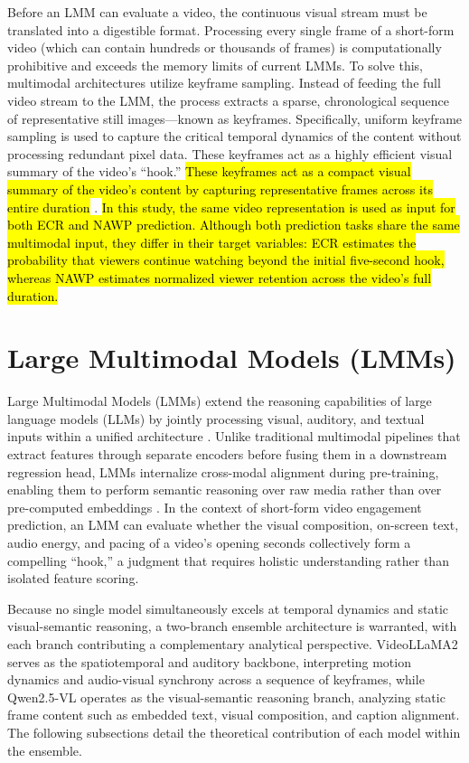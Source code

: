 Before an LMM can evaluate a video, the continuous visual stream must be translated into a digestible format. Processing every single frame of a short-form video (which can contain hundreds or thousands of frames) is computationally prohibitive and exceeds the memory limits of current LMMs. To solve this, multimodal architectures utilize keyframe sampling. Instead of feeding the full video stream to the LMM, the process extracts a sparse, chronological sequence of representative still images—known as keyframes. Specifically, uniform keyframe sampling is used to capture the critical temporal dynamics of the content without processing redundant pixel data. These keyframes act as a highly efficient visual summary of the video's ``hook.'' \hl{These keyframes act as a compact visual summary of the video's content by capturing representative frames across its entire duration} \cite{sun2025engagement}. \hl{In this study, the same video representation is used as input for both ECR and NAWP prediction. Although both prediction tasks share the same multimodal input, they differ in their target variables: ECR estimates the probability that viewers continue watching beyond the initial five-second hook, whereas NAWP estimates normalized viewer retention across the video's full duration.}

\section{Large Multimodal Models (LMMs)}

Large Multimodal Models (LMMs) extend the reasoning capabilities of large language models (LLMs) by jointly processing visual, auditory, and textual inputs within a unified architecture \cite{ge2025lmm}. Unlike traditional multimodal pipelines that extract features through separate encoders before fusing them in a downstream regression head, LMMs internalize cross-modal alignment during pre-training, enabling them to perform semantic reasoning over raw media rather than over pre-computed embeddings \cite{sun2025engagement}. In the context of short-form video engagement prediction, an LMM can evaluate whether the visual composition, on-screen text, audio energy, and pacing of a video's opening seconds collectively form a compelling ``hook,'' a judgment that requires holistic understanding rather than isolated feature scoring.

Because no single model simultaneously excels at temporal dynamics and static visual-semantic reasoning, a two-branch ensemble architecture is warranted, with each branch contributing a complementary analytical perspective. VideoLLaMA2 serves as the spatiotemporal and auditory backbone, interpreting motion dynamics and audio-visual synchrony across a sequence of keyframes, while Qwen2.5-VL operates as the visual-semantic reasoning branch, analyzing static frame content such as embedded text, visual composition, and caption alignment. The  following subsections detail the theoretical contribution of each model within the ensemble.

